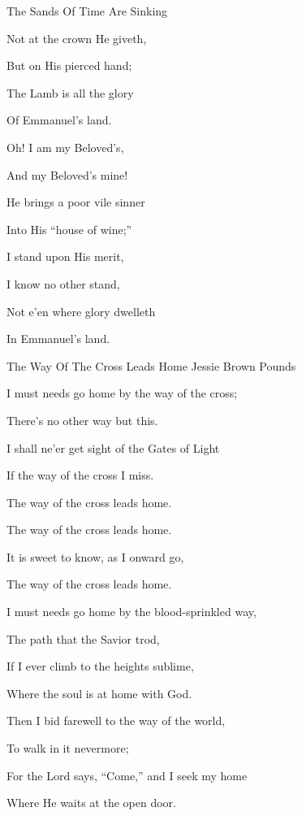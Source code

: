 \documentclass[12pt]{book}
\begin{document}
\begin{song}{The Sands Of Time Are Sinking}{}
\begin{SBVerse}
    Not at the crown He giveth,

    But on His pierced hand;

    The Lamb is all the glory

    Of Emmanuel's land.
  \end{SBVerse}

  \begin{SBVerse}
    Oh! I am my Beloved's,

    And my Beloved's mine!

    He brings a poor vile sinner

    Into His ``house of wine;''

    I stand upon His merit,

    I know no other stand,

    Not e'en where glory dwelleth

    In Emmanuel's land.
  \end{SBVerse}
\end{song}

\begin{song}{The Way Of The Cross Leads Home}{}
  {\SBPubDom}
  {Jessie Brown Pounds}
  {}
  {}

  \begin{SBVerse}
    I must needs go home by the way of the cross;

    There's no other way but this.

    I shall ne'er get sight of the Gates of Light

    If the way of the cross I miss.
  \end{SBVerse}

  \begin{SBOpGroup}
    The way of the cross leads home.

    The way of the cross leads home.

    It is sweet to know, as I onward go,

    The way of the cross leads home.
  \end{SBOpGroup}

  \begin{SBVerse}
    I must needs go home by the blood-sprinkled way,

    The path that the Savior trod,

    If I ever climb to the heights sublime,

    Where the soul is at home with God.
  \end{SBVerse}

  \begin{SBVerse}
    Then I bid farewell to the way of the world,

    To walk in it nevermore;

    For the Lord says, ``Come,'' and I seek my home

    Where He waits at the open door.
  \end{SBVerse}
\end{song}
\end{document}
